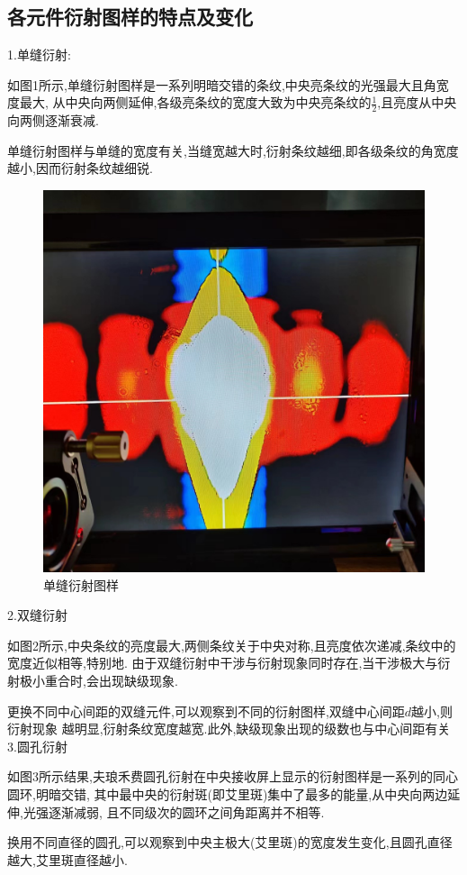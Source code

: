 \documentclass[12pt,a4paper,oneside]{ctexart}
\begin{document}
\subsection*{各元件衍射图样的特点及变化}
\noindent
1.单缝衍射:\par
如图1所示,单缝衍射图样是一系列明暗交错的条纹,中央亮条纹的光强最大且角宽度最大,
从中央向两侧延伸,各级亮条纹的宽度大致为中央亮条纹的$\frac{1}{2}$,且亮度从中央向两侧逐渐衰减.
\par
单缝衍射图样与单缝的宽度有关,当缝宽越大时,衍射条纹越细,即各级条纹的角宽度越小,因而衍射条纹越细锐.\\
\begin{figure}[H]
    \centering
    \includegraphics[scale=0.15]{df.jpg}
    \caption{单缝衍射图样}
\end{figure}
2.双缝衍射\par
如图2所示,中央条纹的亮度最大,两侧条纹关于中央对称,且亮度依次递减,条纹中的宽度近似相等,特别地.
由于双缝衍射中干涉与衍射现象同时存在,当干涉极大与衍射极小重合时,会出现缺级现象.
\par
更换不同中心间距的双缝元件,可以观察到不同的衍射图样,双缝中心间距$d$越小,则衍射现象
越明显,衍射条纹宽度越宽.此外,缺级现象出现的级数也与中心间距有关\\
3.圆孔衍射\par
如图3所示结果,夫琅禾费圆孔衍射在中央接收屏上显示的衍射图样是一系列的同心圆环,明暗交错,
其中最中央的衍射斑(即艾里斑)集中了最多的能量,从中央向两边延伸,光强逐渐减弱,
且不同级次的圆环之间角距离并不相等.
\par
换用不同直径的圆孔,可以观察到中央主极大(艾里斑)的宽度发生变化,且圆孔直径越大,艾里斑直径越小.
\end{document}

